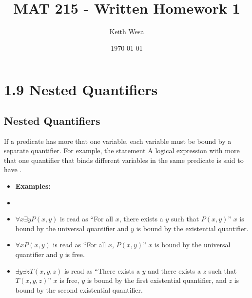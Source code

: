 \documentclass{article}
\author{Keith Wesa}
\title{MAT 215 - Written Homework 1}
\date{\today}
\begin{document}
\section*{1.9 Nested Quantifiers}
\subsection*{Nested Quantifiers}
If a predicate has more that one variable, each variable must be bound by a separate quantifier. For example, the statement
A logical expression with more that one quantifier that binds different variables in the same predicate is said to have .
\begin{itemize}
    \item[] \textbf{Examples:}
    \item[] 
    \item[] $\forall x \exists y P(x,y)$ is read as ``For all $x$, there exists a $y$ such that $P(x,y)$'' $x$ is bound by the universal quantifier and $y$ is bound by the existential quantifier.
    \item[] $\forall x P(x,y)$ is read as ``For all $x$, $P(x,y)$'' $x$ is bound by the universal quantifier and $y$ is free.
    \item[] $\exists y \exists z T(x,y,z)$ is read as ``There exists a $y$ and there exists a $z$ such that $T(x,y,z)$'' $x$ is free, $y$ is bound by the first existential quantifier, and $z$ is bound by the second existential quantifier.
    \end{itemize}
   
\end{document}

